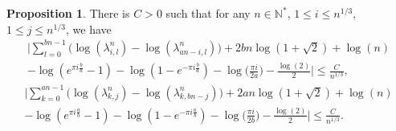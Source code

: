 \documentclass[12pt]{article}
\numberwithin{equation}{section}
\theoremstyle{theorem}
\theoremstyle{definition}
\newtheorem{prop}[thm]{Proposition}
\theoremstyle{remark}
\newcommand{\nat}{\mathbb{N}}
\begin{document}
		\begin{prop}
			There is $C > 0$ such that for any $n \in \nat^*$, $1 \leq i \leq  n^{1/3}$,  $1 \leq j \leq  n^{1/3}$, we have
			\begin{multline}\label{eq_prod_sin_aux_20}
				\bigg|
				\sum_{l = 0}^{bn - 1} 
				\Big( 
				\log(\lambda_{i, l}^{n})
				-
				\log(\lambda_{an-i, l}^{n})
				\Big)
				+
				2bn \log(1 + \sqrt{2})
				+
				\log(n)
				\\
				-
				\log(e^{\pi i \frac{b}{a}} - 1)
				-
				\log(1 - e^{- \pi i \frac{b}{a}})
				-
				\log
				\Big(
					\frac{\pi i}{2a}
				\Big)
				-
				\frac{\log(2)}{2}
				\bigg|
				\leq
				\frac{C}{n^{1/3}},
			\end{multline}
			\vspace*{-0.7cm}
			\begin{multline}\label{eq_prod_sin_aux_2020}
				\bigg|
				\sum_{k = 0}^{an - 1} 
				\Big( 
				\log(\lambda_{k, j}^{n})
				-
				\log(\lambda_{k, bn - j}^{n})
				\Big)
				+
				2an \log(1 + \sqrt{2})
				+
				\log(n)
				\\
				-
				\log(e^{\pi i \frac{a}{b}} - 1)
				-
				\log(1 - e^{- \pi i \frac{a}{b}})
				-
				\log
				\Big(
					\frac{\pi i}{2b}
				\Big)
				-
				\frac{\log(2)}{2}
				\bigg|
				\leq
				\frac{C}{n^{1/3}}.
			\end{multline}
		\end{prop}		 
\end{document}
